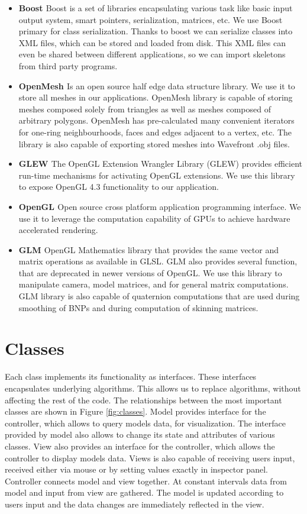 \begin{itemize}
	\item \textbf{Boost \cite{Boost}} Boost is a set of libraries encapsulating various task like basic input output system, smart pointers, serialization, matrices, etc. We use Boost primary for class serialization. Thanks to boost we can serialize classes into XML files, which can be stored and loaded from disk. This XML files can even be shared between different applications, so we can import skeletons from third party programs.
	\item \textbf{OpenMesh \cite{OpenMesh}} Is an open source half edge data structure library. We use it to store all meshes in our applications. OpenMesh library is capable of storing meshes composed solely from triangles as well as meshes composed of arbitrary polygons. OpenMesh has pre-calculated many convenient iterators for one-ring neighbourhoods, faces and edges adjacent to a vertex, etc. The library is also capable of exporting stored meshes into Wavefront .obj files.
	\item \textbf{GLEW \cite{glew}} The OpenGL Extension Wrangler Library (GLEW) provides efficient run-time mechanisms for activating OpenGL extensions. We use this library to expose OpenGL 4.3 functionality to our application.
	\item \textbf{OpenGL \cite{opengl}} Open source cross platform application programming interface. We use it to leverage the computation capability of GPUs to achieve hardware accelerated rendering.
	\item \textbf{GLM \cite{glm}} OpenGL Mathematics library that provides the same vector and matrix operations as available in GLSL. GLM also provides several function, that are deprecated in newer versions of OpenGL. We use this library to manipulate camera, model matrices, and for general matrix computations. GLM library is also capable of quaternion computations that are used during smoothing of BNPs and during computation of skinning matrices.
\end{itemize}

\pagebreak

\section{Classes}

Each class implements its functionality as interfaces.
These interfaces encapsulates underlying algorithms.
This allows us to replace algorithms, without affecting the rest of the code.
The relationships between the most important classes are shown in Figure \ref{fig:classes}.
Model provides interface for the controller, which allows to query models data, for visualization.
The interface provided by model also allows to change its state and attributes of various classes.
View also provides an interface for the controller, which allows the controller to display models data.
Views is also capable of receiving users input, received either via mouse or by setting values exactly in inspector panel.
Controller connects model and view together.
At constant intervals data from model and input from view are gathered.
The model is updated according to users input and the data changes are immediately reflected in the view.

